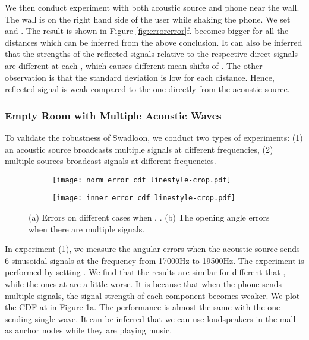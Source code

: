 \documentclass[]{sig-alternate-10pt}
\def \ourprotocol{Swadloon\xspace}
\begin{document}
We then conduct experiment with both acoustic source and phone near the
wall. The wall is on the right hand side of the user while shaking the
phone.  We set  and .
The result is shown in Figure \ref{fig:errorerror}f. 
becomes bigger for all the distances which can be inferred from the
above conclusion. It can also be inferred that the strengths of
the reflected signals relative to the respective direct signals are different at each , which causes different
mean shifts of .  The other observation is that the standard
deviation is low for each distance. Hence, reflected signal is weak
compared to the one directly from the acoustic source.

\subsubsection{Empty Room with Multiple Acoustic Waves}

To validate the robustness of \ourprotocol,
 we conduct two types of experiments: (1) an acoustic source broadcasts multiple
 signals at different frequencies, (2) multiple sources
broadcast signals at different frequencies.
 

\begin{figure}[htb]
    \begin{subfigure}[c]{0.235\textwidth}
       \texttt{[image: norm\_error\_cdf\_linestyle-crop.pdf]}
\end{subfigure}
    \begin{subfigure}[c]{0.22\textwidth}
       \texttt{[image: inner\_error\_cdf\_linestyle-crop.pdf]}
\end{subfigure}
        \caption{(a) Errors on different cases when , . (b) The opening angle 
        errors when there are multiple signals.}
    \label{fig:errorandinnererror}
\end{figure}

In experiment (1), we measure the angular errors when 
the acoustic source sends 6 sinusoidal signals at the frequency from
17000Hz to 19500Hz. The experiment is performed by setting . We find that the results are similar for different  that , while the ones at  are a little 
worse. It is
because that when the phone sends multiple signals, the signal
strength of each component becomes weaker.
We plot the CDF at  in Figure
 \ref{fig:errorandinnererror}a. The performance is almost the same with the one sending single
wave. It can be inferred that we can use
loudspeakers in the mall as anchor nodes while they are 
playing music.
\end{document}
